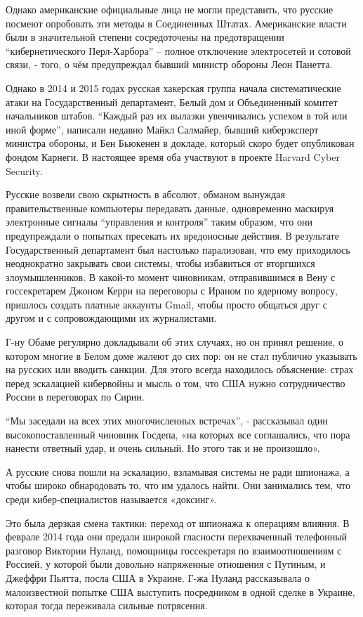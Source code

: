 Однако американские официальные лица не могли представить, что русские
посмеют опробовать эти методы в Соединенных Штатах. Американские власти
были в значительной степени сосредоточены на предотвращении
``кибернетического Перл-Харбора'' -- полное отключение электросетей и
сотовой связи, - того, о чём предупреждал бывший министр обороны Леон
Панетта.

Однако в 2014 и 2015 годах русская хакерская группа начала
систематические атаки на Государственный департамент, Белый дом и
Объединенный комитет начальников штабов. ``Каждый раз их вылазки
увенчивались успехом в той или иной форме'', написали недавно Майкл
Салмайер, бывший киберэксперт министра обороны, и Бен Бьюкенен в
докладе, который скоро будет опубликован фондом Карнеги. В настоящее
время оба участвуют в проекте Harvard Cyber Security.

Русские возвели свою скрытность в абсолют, обманом вынуждая
правительственные компьютеры передавать данные, одновременно маскируя
электронные сигналы ``управления и контроля'' таким образом, что они
предупреждали о попытках пресекать их вредоносные действия. В результате
Государственный департамент был настолько парализован, что ему
приходилось неоднократно закрывать свои системы, чтобы избавиться от
вторгшихся злоумышленников. В какой-то момент чиновникам, отправившимся
в Вену с госсекретарем Джоном Керри на переговоры с Ираном по ядерному
вопросу, пришлось создать платные аккаунты Gmail, чтобы просто общаться
друг с другом и с сопровождающими их журналистами.

Г-ну Обаме регулярно докладывали об этих случаях, но он принял решение,
о котором многие в Белом доме жалеют до сих пор: он не стал публично
указывать на русских или вводить санкции. Для этого всегда находилось
объяснение: страх перед эскалацией кибервойны и мысль о том, что США
нужно сотрудничество России в переговорах по Сирии.

``Мы заседали на всех этих многочисленных встречах'', - рассказывал один
высокопоставленный чиновник Госдепа, «на которых все соглашались, что
пора нанести ответный удар, и очень сильный. Но этого так и не
произошло».

А русские снова пошли на эскалацию, взламывая системы не ради шпионажа,
а чтобы широко обнародовать то, что им удалось найти. Они занимались
тем, что среди кибер-специалистов называется «доксинг».

Это была дерзкая смена тактики: переход от шпионажа к операциям влияния.
В феврале 2014 года они предали широкой гласности перехваченный
телефонный разговор Виктории Нуланд, помощницы госсекретаря по
взаимоотношениям с Россией, у которой были довольно напряженные
отношения с Путиным, и Джеффри Пьятта, посла США в Украине. Г-жа Нуланд
рассказывала о малоизвестной попытке США выступить посредником в одной
сделке в Украине, которая тогда переживала сильные потрясения.

